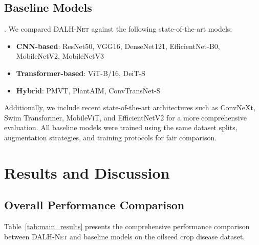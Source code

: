 \documentclass[default, iicol]{sn-jnl}
\theoremstyle{thmstyleone}%
\theoremstyle{thmstyletwo}%
\theoremstyle{thmstylethree}%
\newcommand{\dalh}{\textsc{DALH-Net}}
\begin{document}
\subsection{Baseline Models}
.
We compared \dalh{} against the following state-of-the-art models:

\begin{itemize}
\item \textbf{CNN-based}: ResNet50, VGG16, DenseNet121, EfficientNet-B0, MobileNetV2, MobileNetV3
\item \textbf{Transformer-based}: ViT-B/16, DeiT-S
\item \textbf{Hybrid}: PMVT, PlantAIM, ConvTransNet-S
\end{itemize}
Additionally, we include recent state-of-the-art architectures such as ConvNeXt, Swim Transformer, MobileViT, and EfficientNetV2 for a more comprehensive evaluation.
All baseline models were trained using the same dataset splits, augmentation strategies, and training protocols for fair comparison.

\section{Results and Discussion}\label{sec:results}

\subsection{Overall Performance Comparison}

Table~\ref{tab:main_results} presents the comprehensive performance comparison between \dalh{} and baseline models on the oilseed crop disease dataset.
\end{document}
